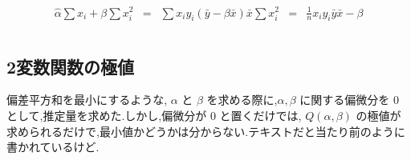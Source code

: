 \documentclass{jsarticle}
\theoremstyle{plain}
\begin{document}
  \begin{eqnarray*}
    \hat{\alpha} \sum x_i + \beta \sum x_i^2 &=& \sum x_i y_i
    (\bar{y} - \beta \bar{x}) \bar{x} \sum x_i^2 &=& \frac{1}{n} x_i y_i
    \bar{y} \bar{x} - \beta 
  \end{eqnarray*}


  \appendix
  \section{}
  \subsection{2変数関数の極値}
  偏差平方和を最小にするような, $\alpha$ と $\beta$ を求める際に,$\alpha, \beta$ に関する偏微分を $0$ として,推定量を求めた.しかし,偏微分が $0$ と置くだけでは,
  $Q(\alpha, \beta)$ の極値が求められるだけで,最小値かどうかは分からない.テキストだと当たり前のように書かれているけど.
\end{document}
